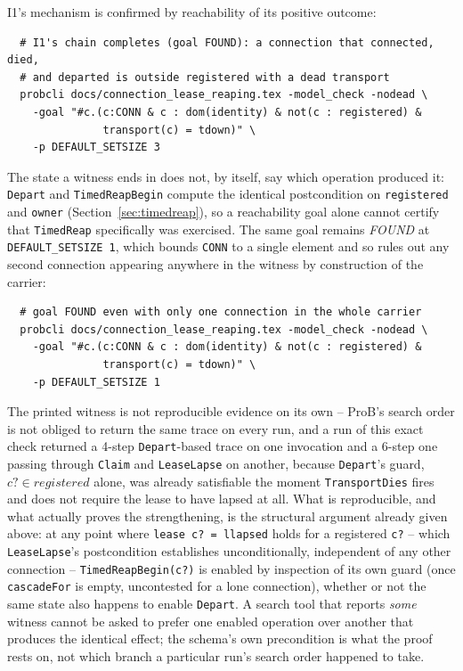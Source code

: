 \documentclass[a4paper,10pt,fleqn]{article}
\begin{document}
I1's mechanism is confirmed by reachability of its positive outcome:

\begin{verbatim}
  # I1's chain completes (goal FOUND): a connection that connected, died,
  # and departed is outside registered with a dead transport
  probcli docs/connection_lease_reaping.tex -model_check -nodead \
    -goal "#c.(c:CONN & c : dom(identity) & not(c : registered) &
               transport(c) = tdown)" \
    -p DEFAULT_SETSIZE 3
\end{verbatim}

The state a witness ends in does not, by itself, say which operation
produced it: \texttt{Depart} and \texttt{TimedReapBegin} compute the
identical postcondition on \texttt{registered} and \texttt{owner}
(Section~\ref{sec:timedreap}), so a reachability goal alone cannot certify
that \texttt{TimedReap} specifically was exercised. The
same goal remains \emph{FOUND} at \texttt{DEFAULT\_SETSIZE 1}, which
bounds \texttt{CONN} to a single element and so rules out any second
connection appearing anywhere in the witness by construction of the
carrier:

\begin{verbatim}
  # goal FOUND even with only one connection in the whole carrier
  probcli docs/connection_lease_reaping.tex -model_check -nodead \
    -goal "#c.(c:CONN & c : dom(identity) & not(c : registered) &
               transport(c) = tdown)" \
    -p DEFAULT_SETSIZE 1
\end{verbatim}

The printed witness is not reproducible evidence on its own -- ProB's
search order is not obliged to return the same trace on every run, and a
run of this exact check returned a 4-step \texttt{Depart}-based trace on
one invocation and a 6-step one passing through \texttt{Claim} and
\texttt{LeaseLapse} on another, because \texttt{Depart}'s guard,
\texttt{$c? \in registered$} alone, was already satisfiable the moment
\texttt{TransportDies} fires and does not require the lease to have
lapsed at all. What is reproducible, and what actually proves the
strengthening, is the structural argument already given above: at any
point where \texttt{lease~c? = llapsed} holds for a registered \texttt{c?}
-- which \texttt{LeaseLapse}'s postcondition establishes unconditionally,
independent of any other connection -- \texttt{TimedReapBegin(c?)} is
enabled by inspection of its own guard (once \texttt{cascadeFor} is empty,
uncontested for a lone connection), whether or not the same state also
happens to enable \texttt{Depart}. A search tool that reports \emph{some}
witness cannot be asked to prefer one enabled operation over another
that produces the identical effect; the schema's own precondition is
what the proof rests on, not which branch a particular run's search
order happened to take.
\end{document}
